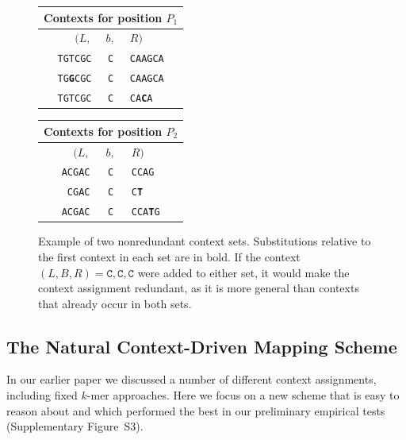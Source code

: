 \begin{figure}
  \begin{minipage}{0.5\linewidth}
  \centering
  \begin{tabular}{rcl}
  \multicolumn{3}{c}{Contexts for position $P_1$} \\ \hline
  $(L,$ & $b,$ & $R)$ \\ 
  \texttt{TGTCGC} & \texttt{C} & \texttt{CAAGCA} \\ 
  \texttt{TG\textbf{G}CGC} & \texttt{C} & \texttt{CAAGCA} \\ 
  \texttt{TGTCGC} & \texttt{C} & \texttt{CA\textbf{C}A} \\ 
  \end{tabular}
  \end{minipage}%
  \begin{minipage}{0.5\linewidth}
  \centering
  \begin{tabular}{rcl}
  \multicolumn{3}{c}{Contexts for position $P_2$} \\ \hline
  $(L,$ & $b,$ & $R)$ \\ 
  \texttt{ACGAC} & \texttt{C} & \texttt{CCAG} \\ 
  \texttt{CGAC} & \texttt{C} & \texttt{C\textbf{T}} \\ 
  \texttt{ACGAC} & \texttt{C} & \texttt{CCA\textbf{T}G} \\
  \end{tabular}
  \end{minipage}

  \caption{Example of two nonredundant context sets. Substitutions relative to the first context in each set are in bold. If the context $(L, B, R) = \texttt{C}, \texttt{C}, \texttt{C}$ were added to either set, it would make the context assignment redundant, as it is more general than contexts that already occur in both sets.}
  \label{fig:contextSets}
\end{figure}

\subsection{The Natural Context-Driven Mapping Scheme}

In our earlier paper \citep{paten2014mapping} we discussed a number of different context assignments, including fixed $k$-mer approaches. Here we focus on a new scheme that is easy to reason about and which performed the best in our preliminary empirical tests (Supplementary Figure~S3).

